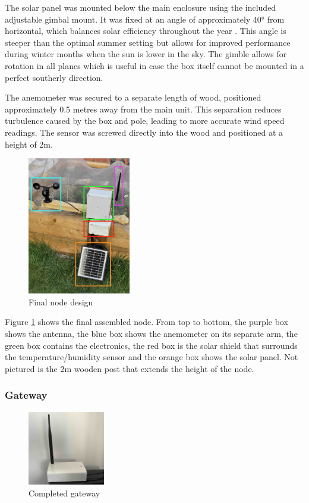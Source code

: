 The solar panel was mounted below the main enclosure using the included
adjustable gimbal mount. It was fixed at an angle of approximately 40° from
horizontal, which balances solar efficiency throughout the year
\cite{cathcart_best-solar-panel_2025}. This angle is steeper than the optimal
summer setting but allows for improved performance during winter months when the
sun is lower in the sky. The gimble allows for rotation in all planes which is
useful in case the box itself cannot be mounted in a perfect southerly
direction.

The anemometer was secured to a separate length of wood, positioned
approximately 0.5 metres away from the main unit. This separation reduces
turbulence caused by the box and pole, leading to more accurate wind speed
readings. The sensor was screwed directly into the wood and positioned at a
height of 2m.


\begin{figure}[H]
    \centering
    \includegraphics[width=0.4\textwidth]{contents/part-2/fig2/annotated-node.jpg}
    \caption{Final node design}
    \label{fig:assembled-node}
\end{figure}

Figure \ref{fig:assembled-node} shows the final assembled node. From top to
bottom, the purple box shows the antenna, the blue box shows the anemometer on
its separate arm, the green box contains the electronics, the red box is the
solar shield that surrounds the temperature/humidity sensor and the orange box
shows the solar panel. Not pictured is the 2m wooden post that extends the
height of the node. 

\subsubsection{Gateway}

\begin{figure}[H]
    \centering
    \includegraphics[width=0.3\textwidth]{contents/part-2/fig2/gateway.jpeg}
    \caption{Completed gateway}
    \label{fig:gateway-final}
\end{figure}

